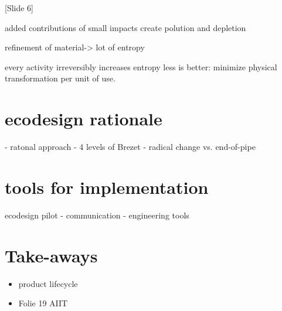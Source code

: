\documentclass{article}
\begin{document}
{\color{blue}[Slide 6]}

added contributions of small impacts create polution and depletion


refinement of material-> lot of entropy

every activity irreversibly increases entropy
less is better: minimize physical transformation per unit of use. 




\section{ecodesign rationale}
\label{sec:ecodesignRationale}
 - ratonal approach
 - 4 levels of Brezet
 - radical change vs. end-of-pipe 

\section{tools for implementation}
\label{sec:tools}
ecodesign pilot - communication - engineering tools


\section{Take-aways}
\label{sec:TakeAways}
\begin{itemize}
	\item product lifecycle
	\item Folie 19 AIIT
\end{itemize}



\end{document}
